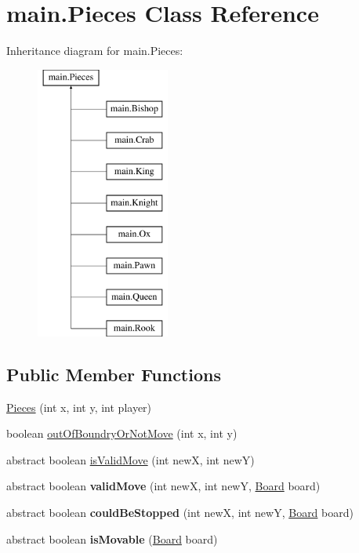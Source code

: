 \hypertarget{classmain_1_1_pieces}{}\section{main.\+Pieces Class Reference}
\label{classmain_1_1_pieces}
Inheritance diagram for main.\+Pieces\+:\begin{figure}[H]
\begin{center}
\leavevmode
\includegraphics[height=9.000000cm]{classmain_1_1_pieces}
\end{center}
\end{figure}
\subsection*{Public Member Functions}
\begin{DoxyCompactItemize}
\item 
\mbox{\hyperlink{classmain_1_1_pieces_aa626e806bdd56045f481edb81dc217dd}{Pieces}} (int x, int y, int player)
\item 
boolean \mbox{\hyperlink{classmain_1_1_pieces_a02d805a58894aca8a12be4dce0ae4125}{out\+Of\+Boundry\+Or\+Not\+Move}} (int x, int y)
\item 
abstract boolean \mbox{\hyperlink{classmain_1_1_pieces_ab9e56890f37271b7eddadd7b634157b1}{is\+Valid\+Move}} (int newX, int newY)
\item 
\mbox{\label{classmain_1_1_pieces_ab77cb1de1e9c3f171a69655c3bf7514c}} 
abstract boolean {\bfseries valid\+Move} (int newX, int newY, \mbox{\hyperlink{classmain_1_1_board}{Board}} board)
\item 
\mbox{\label{classmain_1_1_pieces_a96608930fc453fe197d0f4cb006823ed}} 
abstract boolean {\bfseries could\+Be\+Stopped} (int newX, int newY, \mbox{\hyperlink{classmain_1_1_board}{Board}} board)
\item 
\mbox{\label{classmain_1_1_pieces_a6b3abc04fc214b01781662e4533b2b6f}} 
abstract boolean {\bfseries is\+Movable} (\mbox{\hyperlink{classmain_1_1_board}{Board}} board)
\end{DoxyCompactItemize}
